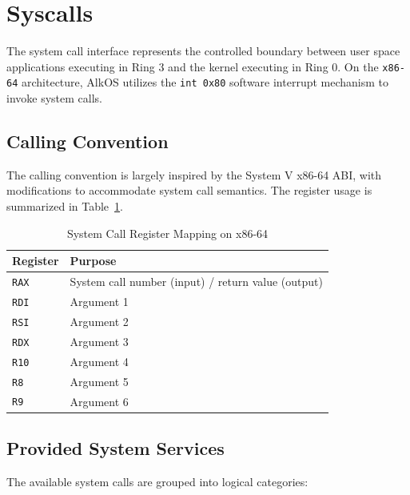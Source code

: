 \documentclass[a4paper,10pt,twoside]{report}
\theoremstyle{definition}
\begin{document}
\section{Syscalls}

The system call interface represents the controlled boundary between user space applications executing in Ring 3 and the kernel executing in Ring 0. On the \texttt{x86-64} architecture, AlkOS utilizes the \texttt{int 0x80} software interrupt mechanism to invoke system calls.

\subsection{Calling Convention}

The calling convention is largely inspired by the System V x86-64 ABI, with modifications to accommodate system call semantics. The register usage is summarized in Table~\ref{tab:syscall_abi}.

\begin{table}[htbp]
\centering
\begin{tabular}{|l|l|}
\hline
\textbf{Register} & \textbf{Purpose} \\ \hline
\texttt{RAX} & System call number (input) / return value (output) \\ \hline
\texttt{RDI} & Argument 1 \\ \hline
\texttt{RSI} & Argument 2 \\ \hline
\texttt{RDX} & Argument 3 \\ \hline
\texttt{R10} & Argument 4 \\ \hline
\texttt{R8} & Argument 5 \\ \hline
\texttt{R9} & Argument 6 \\ \hline
\end{tabular}
\caption{System Call Register Mapping on x86-64}
\label{tab:syscall_abi}
\end{table}

\subsection{Provided System Services}

The available system calls are grouped into logical categories:
\end{document}
